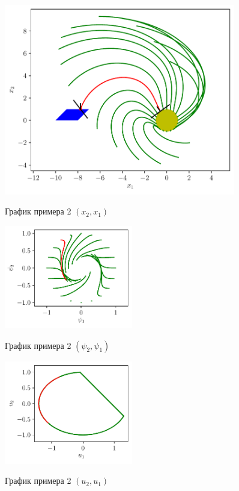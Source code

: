 \documentclass[12pt, a4paper]{article} %
\begin{document}
\begin{figure}[H]
    \begin{centering}
        \includegraphics[width=0.9\textwidth]{figures/ex2_x.pdf}
        \label{fig:ex2_x}
        \caption{График примера 2 $(x_2, x_1)$}
    \end{centering}
    \vfill
    \begin{multicols}{2}
        \includegraphics[width=0.5\textwidth]{figures/ex2_p.pdf}
        \label{fig:ex2_p}
        \caption{График примера 2 $(\psi_2, \psi_1)$}
       \hfill 
       \includegraphics[width=0.5\textwidth]{figures/ex2_u.pdf}
        \label{fig:ex2_u}
        \caption{График примера 2 $(u_2, u_1)$}
    \end{multicols}
\end{figure} 
\end{document}

